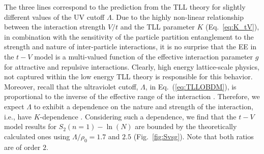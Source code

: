 %
The three lines correspond to the prediction from the TLL theory for slightly
different values of the UV cutoff $\Lambda$. Due to the highly non-linear
relationship between the interaction strength $V/t$ and the TLL parameter $K$
(Eq.~\ref{eq:K_tV}), in combination with the sensitivity of the particle
partition entanglement to the strength and nature of inter-particle
interactions, it is no surprise that the EE in the $t-V$ model is a
multi-valued function of the effective interaction parameter $g$ for attractive
and repulsive interactions. Clearly, high energy lattice-scale physics, not
captured within the low energy TLL theory is responsible for this behavior.
Moreover, recall that the ultraviolet cutoff, $\Lambda$, in
Eq.~(\ref{eq:TLLOBDM}), is proportional to the inverse of the effective range
of the interaction \cite{Dzyaloshinskii:1974un}.  Therefore, we expect
$\Lambda$ to exhibit a dependence on the nature and strength of the
interaction, i.e., have $K$-dependence  \cite{Herdman:2015gx}.  Considering
such a dependence, we find that the $t-V$ model results for $S_2(n=1)-\ln(N)$
are bounded by the theoretically calculated ones using $\Lambda/\rho_0=1.7$ and
$2.5$ (Fig.~\ref{fig:Svsg}). Note that both ratios are of order $2$.

